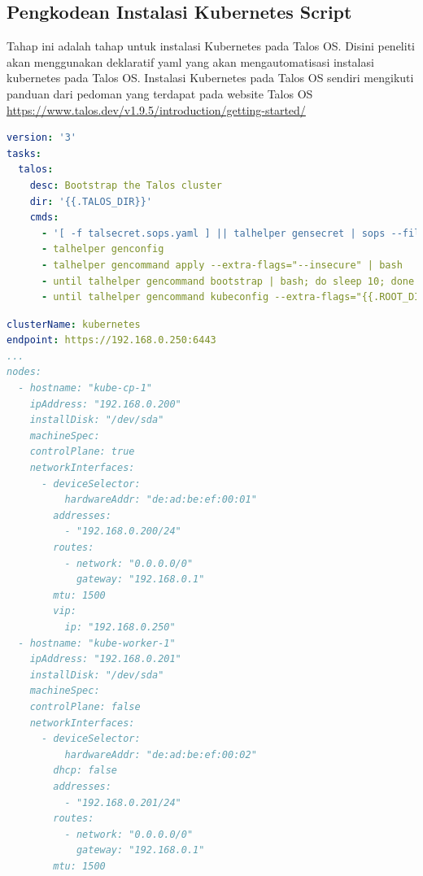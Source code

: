 \subsection{Pengkodean Instalasi Kubernetes Script}
Tahap ini adalah tahap untuk instalasi Kubernetes pada Talos OS. Disini peneliti akan menggunakan deklaratif yaml yang akan mengautomatisasi instalasi kubernetes pada Talos OS.
Instalasi Kubernetes pada Talos OS sendiri mengikuti panduan dari pedoman yang terdapat pada website Talos OS \url{https://www.talos.dev/v1.9.5/introduction/getting-started/}

\begin{table}[!htbp]
  \begin{lstlisting}[language=yaml, basicstyle=\footnotesize\ttfamily]
version: '3'
tasks:
  talos:
    desc: Bootstrap the Talos cluster
    dir: '{{.TALOS_DIR}}'
    cmds:
      - '[ -f talsecret.sops.yaml ] || talhelper gensecret | sops --filename-override talos/talsecret.sops.yaml --encrypt /dev/stdin > talsecret.sops.yaml'
      - talhelper genconfig
      - talhelper gencommand apply --extra-flags="--insecure" | bash
      - until talhelper gencommand bootstrap | bash; do sleep 10; done
      - until talhelper gencommand kubeconfig --extra-flags="{{.ROOT_DIR}} --force" | bash; do sleep 10; done
\end{lstlisting}
  \caption{Konfigurasi script instalasi Kubernetes cluster pada Talos OS}
  \label{tab:yaml-code}
\end{table}
\begin{table}[!htbp]
  \begin{lstlisting}[language=yaml, basicstyle=\footnotesize\ttfamily]
clusterName: kubernetes
endpoint: https://192.168.0.250:6443
...
nodes:
  - hostname: "kube-cp-1"
    ipAddress: "192.168.0.200"
    installDisk: "/dev/sda"
    machineSpec:
    controlPlane: true
    networkInterfaces:
      - deviceSelector:
          hardwareAddr: "de:ad:be:ef:00:01"
        addresses:
          - "192.168.0.200/24"
        routes:
          - network: "0.0.0.0/0"
            gateway: "192.168.0.1"
        mtu: 1500
        vip:
          ip: "192.168.0.250"
  - hostname: "kube-worker-1"
    ipAddress: "192.168.0.201"
    installDisk: "/dev/sda"
    machineSpec:
    controlPlane: false
    networkInterfaces:
      - deviceSelector:
          hardwareAddr: "de:ad:be:ef:00:02"
        dhcp: false
        addresses:
          - "192.168.0.201/24"
        routes:
          - network: "0.0.0.0/0"
            gateway: "192.168.0.1"
        mtu: 1500
\end{lstlisting}
  \caption{Konfigurasi script instalasi Kubernetes cluster pada Talos OS}
  \label{tab:yaml-code-2}
\end{table}
